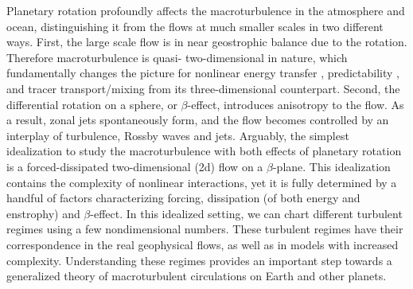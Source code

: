 \documentclass{jfm}
\begin{document}
Planetary rotation profoundly affects the macroturbulence in the
atmosphere and ocean, distinguishing it from the flows at much smaller
scales in two different ways. First, the large scale flow is in near
geostrophic balance due to the rotation. Therefore macroturbulence
is quasi- two-dimensional in nature, which fundamentally changes the
picture for nonlinear energy transfer \citep{Kraichnan1967,Charney1971},
predictability \citep{Leith1971,Leith1972}, and tracer transport/mixing
\citep{Batchelor1959,Shuckburgh2003} from its three-dimensional counterpart.
Second, the differential rotation on a sphere, or $\beta$-effect,
introduces anisotropy to the flow. As a result, zonal jets spontaneously
form, and the flow becomes controlled by an interplay of turbulence, Rossby waves
and jets. Arguably, the simplest idealization to study the macroturbulence
with both effects of planetary rotation is a forced-dissipated two-dimensional
(2d) flow on a $\beta$-plane. This idealization contains the complexity
of nonlinear interactions, yet it is fully determined by a handful
of factors characterizing forcing, dissipation (of both energy and enstrophy) and
$\beta$-effect. In this idealized setting, we can chart
different turbulent regimes using a few nondimensional numbers.
These turbulent regimes have their correspondence in the real geophysical
flows, as well as in models with increased complexity. Understanding
these regimes provides an important step towards a generalized theory 
of macroturbulent circulations on Earth and other planets.
\end{document}
